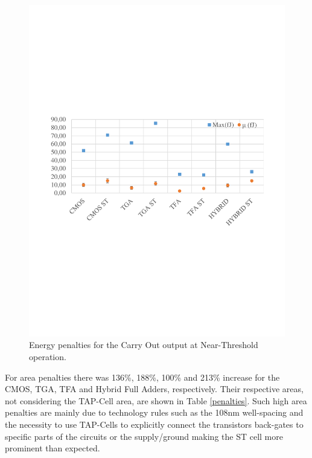 \documentclass[ecp,tc, english]{iiufrgs}
\begin{document}
\begin{figure}[H]
\centering
\includegraphics[width=\textwidth, trim={0 9cm 0 9cm},clip]{energyNTCarryOut.pdf}
\caption{Energy penalties for the Carry Out output at Near-Threshold operation.}
\label{fig:energyNTCO}
\end{figure}

For area penalties there was 136\%, 188\%, 100\% and 213\% increase for the CMOS, TGA, TFA and Hybrid Full Adders, respectively. Their respective areas, not considering the TAP-Cell area, are shown in Table \ref{penalties}. Such high area penalties are mainly due to technology rules such as the 108nm well-spacing and the necessity to use TAP-Cells to explicitly connect the transistors back-gates to specific parts of the circuits or the supply/ground making the ST cell more prominent than expected.
\end{document}
